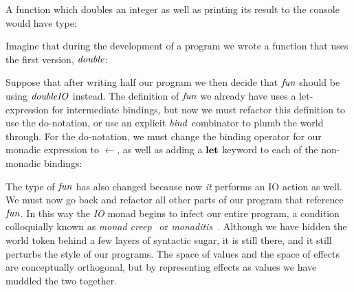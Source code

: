 \code{
	$\idouble :: \iInt \to \iInt$
}

A function which doubles an integer as well as printing its result to the console would have type:

\code{
	$\idoubleIO :: \iInt \to \iIO \iInt$
}

Imagine that during the development of a program we wrote a function that uses the first version, $\operatorname{\mathit{double}}$:


Suppose that after writing half our program we then decide that $\operatorname{\mathit{fun}}$ should be using $\operatorname{\mathit{doubleIO}}$ instead. The definition of $\operatorname{\mathit{fun}}$ we already have uses a let-expression for intermediate bindings, but now we must refactor this definition to use the do-notation, or use an explicit $\operatorname{\mathit{bind}}$ combinator to plumb the world through. For the do-notation, we must change the binding operator for our monadic expression to $\gets$, as well as adding a $\textrm{\textbf{let}}$ keyword to each of the non-monadic bindings:


The type of $\operatorname{\mathit{fun}}$ has also changed because now \emph{it} performs an IO action as well. We must now go back and refactor all other parts of our program that reference $\operatorname{\mathit{fun}}$. In this way the \emph{IO} monad begins to infect our entire program, a condition colloquially known as \emph{monad creep}~\cite{louis:monads-hard-drugs} or \emph{monaditis}~\cite{karczmarczuk:monaditis}. Although we have hidden the world token behind a few layers of syntactic sugar, it is still there, and it still perturbs the style of our programs. The space of values and the space of effects are conceptually orthogonal, but by representing effects as values we have muddled the two together.

